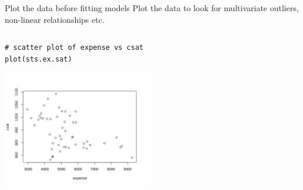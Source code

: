 \documentclass[table,smaller]{beamer}
\begin{document}
\begin{frame}[fragile,label=sec-2-2]{Plot the data before fitting models}
 Plot the data to look for multivariate outliers, non-linear relationships etc.

\begin{columns}  \begin{block}{}
\begin{verbatim}
# scatter plot of expense vs csat
plot(sts.ex.sat)
\end{verbatim}

\includegraphics[width=2.5in]{images/statesCorr1.png}


\end{block} \end{columns}
\end{frame}
\end{document}
